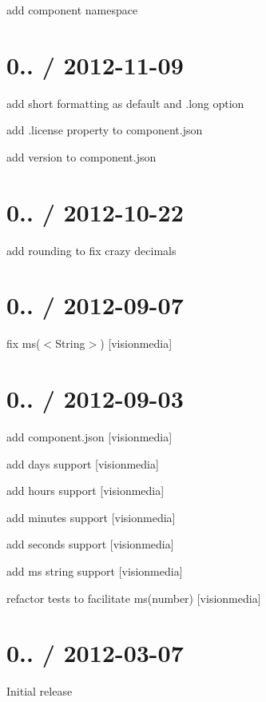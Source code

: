 \begin{DoxyItemize}
\item add component namespace
\end{DoxyItemize}

\section*{0.. / 2012-\/11-\/09 }


\begin{DoxyItemize}
\item add short formatting as default and .long option
\item add .license property to component.\+json
\item add version to component.\+json
\end{DoxyItemize}

\section*{0.. / 2012-\/10-\/22 }


\begin{DoxyItemize}
\item add rounding to fix crazy decimals
\end{DoxyItemize}

\section*{0.. / 2012-\/09-\/07 }


\begin{DoxyItemize}
\item fix {\ttfamily ms($<$String$>$)} \mbox{[}visionmedia\mbox{]}
\end{DoxyItemize}

\section*{0.. / 2012-\/09-\/03 }


\begin{DoxyItemize}
\item add component.\+json \mbox{[}visionmedia\mbox{]}
\item add days support \mbox{[}visionmedia\mbox{]}
\item add hours support \mbox{[}visionmedia\mbox{]}
\item add minutes support \mbox{[}visionmedia\mbox{]}
\item add seconds support \mbox{[}visionmedia\mbox{]}
\item add ms string support \mbox{[}visionmedia\mbox{]}
\item refactor tests to facilitate ms(number) \mbox{[}visionmedia\mbox{]}
\end{DoxyItemize}

\section*{0.. / 2012-\/03-\/07 }


\begin{DoxyItemize}
\item Initial release 
\end{DoxyItemize}